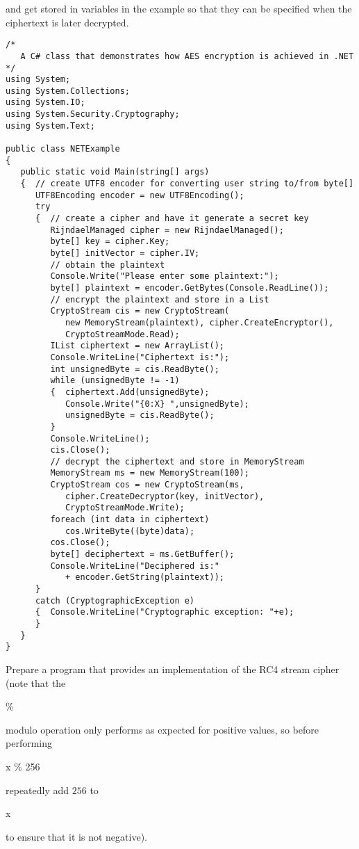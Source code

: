 and get stored in variables in the example so that they can be specified when
the ciphertext is later decrypted.
\begin{figure*}\begin{program}\begin{verbatim}
/*
   A C# class that demonstrates how AES encryption is achieved in .NET
*/
using System;
using System.Collections;
using System.IO;
using System.Security.Cryptography;
using System.Text;

public class NETExample
{
   public static void Main(string[] args)
   {  // create UTF8 encoder for converting user string to/from byte[]
      UTF8Encoding encoder = new UTF8Encoding();
      try
      {  // create a cipher and have it generate a secret key
         RijndaelManaged cipher = new RijndaelManaged();
         byte[] key = cipher.Key;
         byte[] initVector = cipher.IV;
         // obtain the plaintext
         Console.Write("Please enter some plaintext:");
         byte[] plaintext = encoder.GetBytes(Console.ReadLine());
         // encrypt the plaintext and store in a List
         CryptoStream cis = new CryptoStream(
            new MemoryStream(plaintext), cipher.CreateEncryptor(),
            CryptoStreamMode.Read);
         IList ciphertext = new ArrayList();
         Console.WriteLine("Ciphertext is:");
         int unsignedByte = cis.ReadByte();
         while (unsignedByte != -1)
         {  ciphertext.Add(unsignedByte);
            Console.Write("{0:X} ",unsignedByte);
            unsignedByte = cis.ReadByte();
         }
         Console.WriteLine();
         cis.Close();
         // decrypt the ciphertext and store in MemoryStream
         MemoryStream ms = new MemoryStream(100);
         CryptoStream cos = new CryptoStream(ms,
            cipher.CreateDecryptor(key, initVector),
            CryptoStreamMode.Write);
         foreach (int data in ciphertext)
            cos.WriteByte((byte)data);
         cos.Close();
         byte[] deciphertext = ms.GetBuffer();
         Console.WriteLine("Deciphered is:"
            + encoder.GetString(plaintext));
      }
      catch (CryptographicException e)
      {  Console.WriteLine("Cryptographic exception: "+e);
      }
   }
}
\end{verbatim}\end{program}\end{figure*}


\begin{exercise}[Implementation of RC4]
Prepare a program that provides an implementation of the RC4 stream cipher
(note that the \begin{code}\%\end{code} modulo operation only performs as
expected for positive values, so before performing \begin{code}x \% 256\end{code}
repeatedly add $256$ to \begin{code}x\end{code} to ensure that it is not negative).
\end{exercise}


